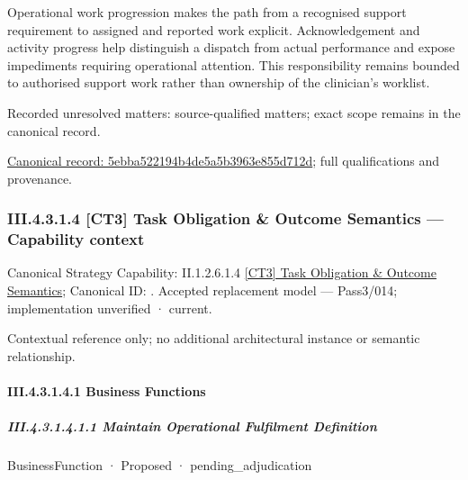 Operational work progression makes the path from a recognised support requirement to assigned and reported work explicit. Acknowledgement and activity progress help distinguish a dispatch from actual performance and expose impediments requiring operational attention. This responsibility remains bounded to authorised support work rather than ownership of the clinician's worklist.


{\small Recorded unresolved matters: source-qualified matters; exact scope remains in the canonical record.}\par
{\footnotesize \href{../../../../continuum/business/business-process/5ebba522194b4de5a5b3963e855d712d.md}{Canonical record: 5ebba522194b4de5a5b3963e855d712d}; full qualifications and provenance.}\par
\subsubsection*{III.4.3.1.4 [CT3] Task Obligation \& Outcome Semantics — Capability context}
\label{navigation:III.4.3.1.4}

{\small Canonical Strategy Capability: II.1.2.6.1.4 \hyperref[element:aa301a98cf30454889f1eec8f0a742ab]{[CT3] Task Obligation \& Outcome Semantics}; Canonical ID: \texttt{}. Accepted replacement model — Pass3/014; implementation unverified · current.}\par
Contextual reference only; no additional architectural instance or semantic relationship.\par
\paragraph*{III.4.3.1.4.1 Business Functions}
\label{navigation:III.4.3.1.4.1}

\subparagraph*{III.4.3.1.4.1.1 Maintain Operational Fulfilment Definition}
\label{navigation:III.4.3.1.4.1.1}

\label{element:9f7085926221436bb672e52e59bca512}
{\small BusinessFunction · Proposed · pending\_adjudication}\par

